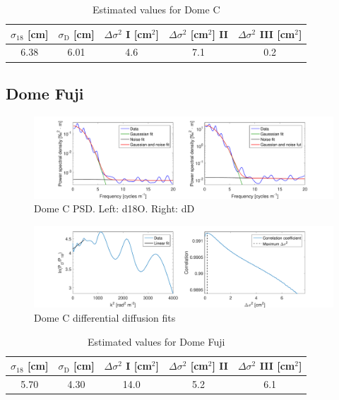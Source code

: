 \documentclass[11pt, draftcls, onecolumn]{IEEEtran} %
\numberwithin{equation}{section}
\numberwithin{table}{section}
\numberwithin{figure}{section}
\begin{document}
\begin{appendices}
\begin{table}[H]
	\center
	\caption{Estimated values for Dome C}
	\label{DomeC}
	\begin{tabular}{c c c c c} 
		\toprule
		$\sigma_{18}$ [cm] & $\sigma_\mathrm{D}$ [cm] & $\Delta\sigma^2$ I [cm$^2$] & $\Delta\sigma^2$ [cm$^2$] II & $\Delta\sigma^2$ III [cm$^2$] \\
		\midrule
		  6.38 &   6.01 &     4.6 &     7.1 &     0.2 \\
		\bottomrule		
	\end{tabular}
\end{table}

\clearpage
\subsection{Dome Fuji}

\begin{figure}[H]
	\vspace*{2mm}
	\centering
	\includegraphics[width=1\textwidth]{Figure_31}
	\caption{Dome C PSD. Left: d18O. Right: dD}  \label{fig:DomeF_fig_1}
\end{figure}

\begin{figure}[H]
	\vspace*{2mm}
	\begin{center}
		\includegraphics[width=1\textwidth]{Figure_32}
		\caption{Dome C differential diffusion fits}  \label{fig:DomeF_fig_2}
	\end{center}
\end{figure}

\begin{table}[H]
	\center
	\caption{Estimated values for Dome Fuji}
	\label{DomeF}
	\begin{tabular}{c c c c c} 
		\toprule
		$\sigma_{18}$ [cm] & $\sigma_\mathrm{D}$ [cm] & $\Delta\sigma^2$ I [cm$^2$] & $\Delta\sigma^2$ [cm$^2$] II & $\Delta\sigma^2$ III [cm$^2$] \\
		\midrule
		5.70 &   4.30 &    14.0 &     5.2 &     6.1 \\
		\bottomrule		
	\end{tabular}
\end{table}


\end{appendices}





\end{document}
